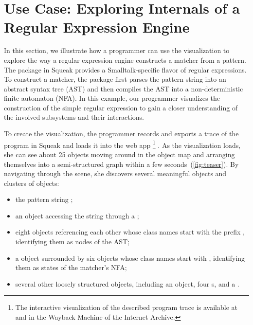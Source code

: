 \section{Use Case: Exploring Internals of a Regular Expression Engine}
\label{sec:use_case}

In this section, we illustrate how a programmer can use the \tfd{} visualization to explore the way a regular expression engine constructs a matcher from a pattern.
The  package in Squeak provides a Smalltalk-specific flavor of regular expressions.
To construct a matcher, the package first parses the pattern string into an abstract syntax tree (AST) and then compiles the AST into a non-deterministic finite automaton (NFA).
In this example, our programmer visualizes the construction of the simple regular expression  to gain a closer understanding of the involved subsystems and their interactions.

To create the visualization, the programmer records and exports a trace of the program  in Squeak and loads it into the \tfd{} web app%
\footnote{The interactive visualization of the described program trace is available at  and in the Wayback Machine of the Internet Archive.}%
.
As the visualization loads, she can see about 25 objects moving around in the object map and arranging themselves into a semi-structured graph within a few seconds~(\cref{fig:teaser}).
By navigating through the scene, she discovers several meaningful objects and clusters of objects:

\begin{itemize}
	\item the pattern string ;
	\item an  object accessing the string through a ;
	\item eight objects referencing each other whose class names start with the prefix , identifying them as nodes of the AST;
	\item a  object surrounded by six objects whose class names start with , identifying them as states of the matcher's NFA;
	\item several other loosely structured objects, including an  object, four s, and a .
\end{itemize}

